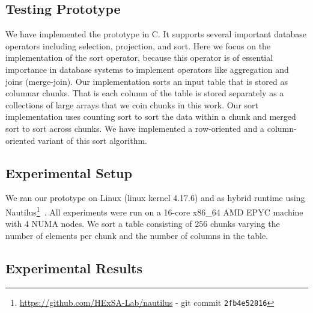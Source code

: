 \documentclass[conference]{IEEEtran}
\begin{document}
\subsection{Testing Prototype}
\label{sec:testing-prototype}

We have implemented the prototype in C. It supports several important database operators including selection, projection, and sort.  Here we focus on the implementation of the sort operator, because this  operator is of essential importance in database systems to implement operators like aggregation and joins (merge-join). Our implementation sorts an input table that is stored as columnar chunks. That is each column of the table is stored separately as a collections of large arrays that we coin chunks in this work. Our sort implementation uses counting sort to sort the data within a chunk and merged sort to sort across chunks. We have implemented a row-oriented and a column-oriented variant of this sort algorithm.

\subsection{Experimental Setup}
\label{sec:experimental-setup}

We ran our prototype on Linux (linux kernel 4.17.6) and as hybrid runtime using Nautilus\footnote{\url{https://github.com/HExSA-Lab/nautilus} - git commit \texttt{2fb4e52816}}~\cite{HALE:2015:NAUTILUS,HALE:2016:HRTHVM}. 
All experiments were run on a 16-core x86\_64 AMD EPYC machine with 4 NUMA nodes.
We sort a table consisting of  $256$ chunks varying the number of elements per chunk and the number of columns in the table.

\subsection{Experimental Results}
\label{sec:experimental-results}
\end{document}
